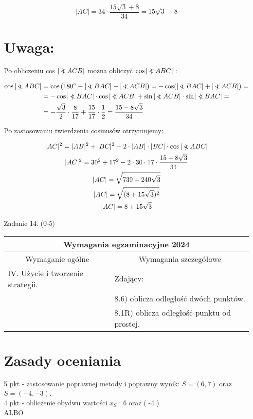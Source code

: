 \documentclass[10pt]{article}
\newcommand\Varangle{\mathop{{<\!\!\!\!\!\text{\small)}}\:}\nolimits}
\begin{document}
$$
|A C|=34 \cdot \frac{15 \sqrt{3}+8}{34}=15 \sqrt{3}+8
$$

\section*{Uwaga:}
Po obliczeniu cos $|\Varangle A C B|$ można obliczyć $\cos |\Varangle A B C|$ :

$$
\begin{aligned}
\cos |\Varangle A B C| & =\cos \left(180^{\circ}-|\Varangle B A C|-|\Varangle A C B|\right)=-\cos (|\Varangle B A C|+|\Varangle A C B|)= \\
& =-\cos |\Varangle B A C| \cdot \cos |\Varangle A C B|+\sin |\Varangle A C B| \cdot \sin |\Varangle B A C|= \\
& =-\frac{\sqrt{3}}{2} \cdot \frac{8}{17}+\frac{15}{17} \cdot \frac{1}{2}=\frac{15-8 \sqrt{3}}{34}
\end{aligned}
$$

Po zastosowaniu twierdzenia cosinusów otrzymujemy:

$$
\begin{gathered}
|A C|^{2}=|A B|^{2}+|B C|^{2}-2 \cdot|A B| \cdot|B C| \cdot \cos |\Varangle A B C| \\
|A C|^{2}=30^{2}+17^{2}-2 \cdot 30 \cdot 17 \cdot \frac{15-8 \sqrt{3}}{34} \\
|A C|=\sqrt{739+240 \sqrt{3}} \\
|A C|=\sqrt{(8+15 \sqrt{3})^{2}} \\
|A C|=8+15 \sqrt{3}
\end{gathered}
$$

Zadanie 14. (0-5)

\begin{center}
\begin{tabular}{|l|l|}
\hline
\multicolumn{2}{|c|}{Wymagania egzaminacyjne 2024} \\
\hline
\multicolumn{1}{|c|}{Wymaganie ogólne} & \multicolumn{1}{c|}{Wymagania szczegółowe} \\
\hline
IV. Użycie i tworzenie strategii. & Zdający: \\
 & 8.6) oblicza odległość dwóch punktów. \\
 & 8.1R) oblicza odległość punktu od prostej. \\
\hline
\end{tabular}
\end{center}

\section*{Zasady oceniania}
5 pkt - zastosowanie poprawnej metody i poprawny wynik: $S=(6,7)$ oraz $S=(-4,-3)$.\\
4 pkt - obliczenie obydwu wartości $x_{S}$ : 6 oraz ( -4 )\\
ALBO
\end{document}
